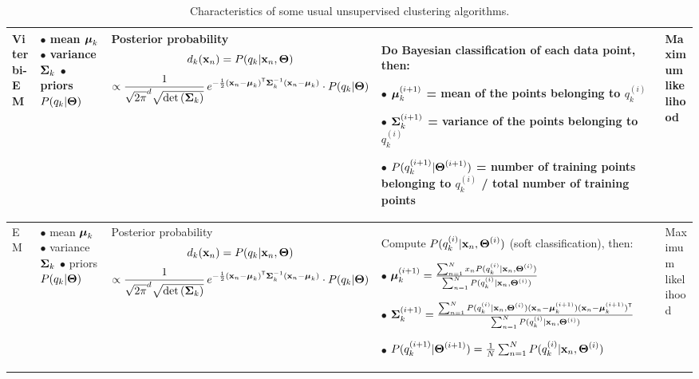 \documentclass[a4paper]{article}
\newcommand{\trn}{^{\mathsf T}} %
\newcommand{\xv}{\ensuremath\mathbf{x}}  %
\newcommand{\muv}{\ensuremath\boldsymbol{\mu}}  %
\newcommand{\Sm}{\ensuremath\boldsymbol{\Sigma}}  %
\newcommand{\Tm}{\ensuremath\boldsymbol{\Theta}}  %
\begin{document}
\begin{latexonly}
\begin{table}
\begin{tabular}{|>{\RR}m{5.2em}|>{\RR}m{7.3em}|>{\CC}m{21em}|>{\RR}m{22.5em}|>{\CC}m{8em}|}
    Viterbi-EM &
    $\bullet$ mean $\muv_k$ \linebreak
    $\bullet$ variance $\Sm_k$ \linebreak
    $\bullet$ priors $P(q_k|\Tm)$
    &
    Posterior probability
    \[
    d_k(\xv_n) = P(q_k|\xv_n,\Tm)
    \]
    \footnotesize
    \[
    \propto \frac{1}{\sqrt{2\pi}^d \sqrt{\det\left(\Sm_k\right)}}
    \, e^{-\frac{1}{2} (\xv_n-\muv_k)\trn \Sm_k^{-1} (\xv_n-\muv_k)}
    \cdot P(q_k|\Tm)
    \]
    \normalsize
    &
    Do Bayesian classification of each data point, then:

    \medskip
    $\bullet$ $\muv_{k}^{(i+1)}$ = mean of the points belonging to $q_k^{(i)}$

    \medskip
    $\bullet$ $\Sm_{k}^{(i+1)}$ = variance of the points belonging to $q_k^{(i)}$

    \medskip
    $\bullet$ $P(q_k^{(i+1)}|\Tm^{(i+1)})$ = number of training points
    belonging to $q_k^{(i)}$ / total number of training points
    &
    Maximum likelihood \\ \hline
    EM &
    $\bullet$ mean $\muv_k$ \linebreak
    $\bullet$ variance $\Sm_k$ \linebreak
    $\bullet$ priors $P(q_k|\Tm)$ &
    Posterior probability
    \[
    d_k(\xv_n) = P(q_k|\xv_n,\Tm)
    \]
    \footnotesize
    \[
    \propto \frac{1}{\sqrt{2\pi}^d \sqrt{\det\left(\Sm_k\right)}}
    \, e^{-\frac{1}{2} (\xv_n-\muv_k)\trn \Sm_k^{-1} (\xv_n-\muv_k)}
    \cdot P(q_k|\Tm)
    \]
    \normalsize
    &
    Compute $P(q_k^{(i)}|\xv_n,\Tm^{(i)})$ (soft classification), then:

    \medskip
    $\bullet$ $\muv_{k}^{(i+1)} = \frac{\sum_{n=1}^{N} x_n P(q_k^{(i)}|\xv_n,\Tm^{(i)})}
    {\sum_{n=1}^{N} P(q_k^{(i)}|\xv_n,\Tm^{(i)})} $

    \medskip
    $\bullet$ $\Sm_{k}^{(i+1)} = \frac{\sum_{n=1}^{N} P(q_k^{(i)}|\xv_n,\Tm^{(i)})
      (\xv_n - \muv_k^{(i+1)})(\xv_n - \muv_k^{(i+1)})\trn }
    {\sum_{n=1}^{N} P(q_k^{(i)}|\xv_n,\Tm^{(i)})} $

    \medskip
    $\bullet$ $P(q_k^{(i+1)}|\Tm^{(i+1)}) = \frac{1}{N} \sum_{n=1}^{N} P(q_k^{(i)}|\xv_n,\Tm^{(i)}) $ &
    Maximum likelihood \\ \hline
  \end{tabular}

  \caption{\label{algos}Characteristics of some usual unsupervised
    clustering algorithms.}
\end{table}
%
\end{latexonly}
\end{document}
